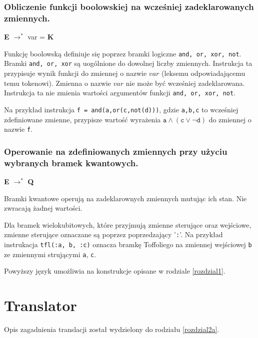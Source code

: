 \subsubsection{Obliczenie funkcji boolowskiej na wcześniej zadeklarowanych zmiennych.}
\begin{center}
    \textbf{E} $\rightarrow^*$ var = \textbf{K}
\end{center}
Funkcję boolowską definiuje się poprzez bramki logiczne \texttt{and, or, xor, not}. Bramki \texttt{and, or, xor} są uogólnione do dowolnej liczby zmiennych. Instrukcja ta przypisuje wynik funkcji do zmiennej o nazwie $var$ (leksemu odpowiadającemu temu tokenowi). Zmienna o nazwie $var$ nie może być wcześniej zadeklarowana. Instrukcja ta nie zmienia wartości argumentów funkcji \texttt{and, or, xor, not}. 
\par Na przykład instrukcja \texttt{f = and(a,or(c,not(d)))}, gdzie \texttt{a,b,c} to wcześniej zdefiniowane zmienne, przypisze wartość wyrażenia $\texttt{a} \land (\texttt{c} \lor \neg \texttt{d})$ do zmiennej o nazwie \texttt{f}.
\subsubsection{Operowanie na zdefiniowanych zmiennych przy użyciu wybranych bramek kwantowych.}
\begin{center}
    \textbf{E} $\rightarrow^*$ \textbf{Q}
\end{center}
Bramki kwantowe operują na zadeklarownych zmiennych mutując ich stan. Nie zwracają żadnej wartości.
\par Dla bramek wielokubitowych, które przyjmują zmienne sterujące oraz wejściowe, zmienne sterujące oznaczane są poprzez poprzedzający '\texttt{:}'. Na przykład instrukacja \texttt{tfl(:a, b, :c)} oznacza bramkę Toffoliego na zmiennej wejściowej \texttt{b} ze zmiennymi strującymi \texttt{a}, \texttt{c}.\\
\par Powyższy język umożliwia na konstrukcje opisane w rodziale \ref{rozdzial1}.
\section{Translator}
Opis zagadnienia translacji został wydzielony do rodziału \ref{rozdzial2a}.
